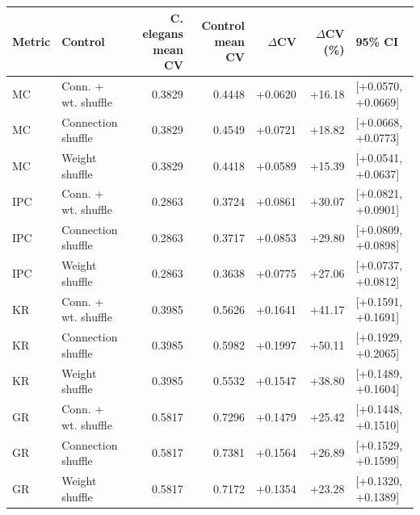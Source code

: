 \begin{tabular}{llrrrrl}
\toprule
Metric & Control & C. elegans mean CV & Control mean CV & $\Delta$CV & $\Delta$CV (\%) & 95\% CI \\
\midrule
MC & Conn. + wt. shuffle & 0.3829 & 0.4448 & +0.0620 & +16.18 & [+0.0570, +0.0669] \\
MC & Connection shuffle & 0.3829 & 0.4549 & +0.0721 & +18.82 & [+0.0668, +0.0773] \\
MC & Weight shuffle & 0.3829 & 0.4418 & +0.0589 & +15.39 & [+0.0541, +0.0637] \\
IPC & Conn. + wt. shuffle & 0.2863 & 0.3724 & +0.0861 & +30.07 & [+0.0821, +0.0901] \\
IPC & Connection shuffle & 0.2863 & 0.3717 & +0.0853 & +29.80 & [+0.0809, +0.0898] \\
IPC & Weight shuffle & 0.2863 & 0.3638 & +0.0775 & +27.06 & [+0.0737, +0.0812] \\
KR & Conn. + wt. shuffle & 0.3985 & 0.5626 & +0.1641 & +41.17 & [+0.1591, +0.1691] \\
KR & Connection shuffle & 0.3985 & 0.5982 & +0.1997 & +50.11 & [+0.1929, +0.2065] \\
KR & Weight shuffle & 0.3985 & 0.5532 & +0.1547 & +38.80 & [+0.1489, +0.1604] \\
GR & Conn. + wt. shuffle & 0.5817 & 0.7296 & +0.1479 & +25.42 & [+0.1448, +0.1510] \\
GR & Connection shuffle & 0.5817 & 0.7381 & +0.1564 & +26.89 & [+0.1529, +0.1599] \\
GR & Weight shuffle & 0.5817 & 0.7172 & +0.1354 & +23.28 & [+0.1320, +0.1389] \\
\bottomrule
\end{tabular}
